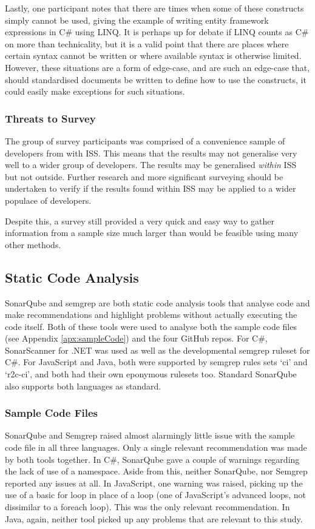 \documentclass{article}
\begin{document}
            Lastly, one participant notes that there are times when some of these constructs simply cannot be used, giving the example of writing entity framework expressions in C\# using LINQ. It is perhaps up for debate if LINQ counts as C\# on more than technicality, but it is a valid point that there are places where certain syntax cannot be written or where available syntax is otherwise limited. However, these situations are a form of edge-case, and are such an edge-case that, should standardised documents be written to define how to use the constructs, it could easily make exceptions for such situations.

        \subsubsection{Threats to Survey}
            The group of survey participants was comprised of a convenience sample of developers from with ISS. This means that the results may not generalise very well to a wider group of developers. The results may be generalised \emph{within} ISS but not outside. Further research and more significant surveying should be undertaken to verify if the results found within ISS may be applied to a wider populace of developers.

            Despite this, a survey still provided a very quick and  easy way to gather information from a sample size much larger than would be feasible using many other methods.
    \subsection{Static Code Analysis}
        SonarQube and semgrep are both static code analysis tools that analyse code and make recommendations and highlight problems without actually executing the code itself. Both of these tools were used to analyse both the sample code files (see Appendix \ref{apx:sampleCode}) and the four GitHub repos. For C\#, SonarScanner for .NET was used as well as the developmental semgrep ruleset for C\#. For JavaScript and Java, both were supported by semgrep rules sets `ci' and `r2c-ci', and both had their own eponymous rulesets too. Standard SonarQube also supports both languages as standard.
        \subsubsection{Sample Code Files}
            SonarQube and Semgrep raised almost alarmingly little issue with the sample code file in all three languages. Only a single relevant recommendation was made by both tools together.
            In C\#, SonarQube gave a couple of warnings regarding the lack of use of a namespace. Aside from this, neither SonarQube, nor Semgrep reported any issues at all. In JavaScript, one warning was raised, picking up the use of a basic for loop in place of a  loop (one of JavaScript's advanced loops, not dissimilar to a foreach loop). This was the only relevant recommendation. In Java, again, neither tool picked up any problems that are relevant to this study.
\end{document}
